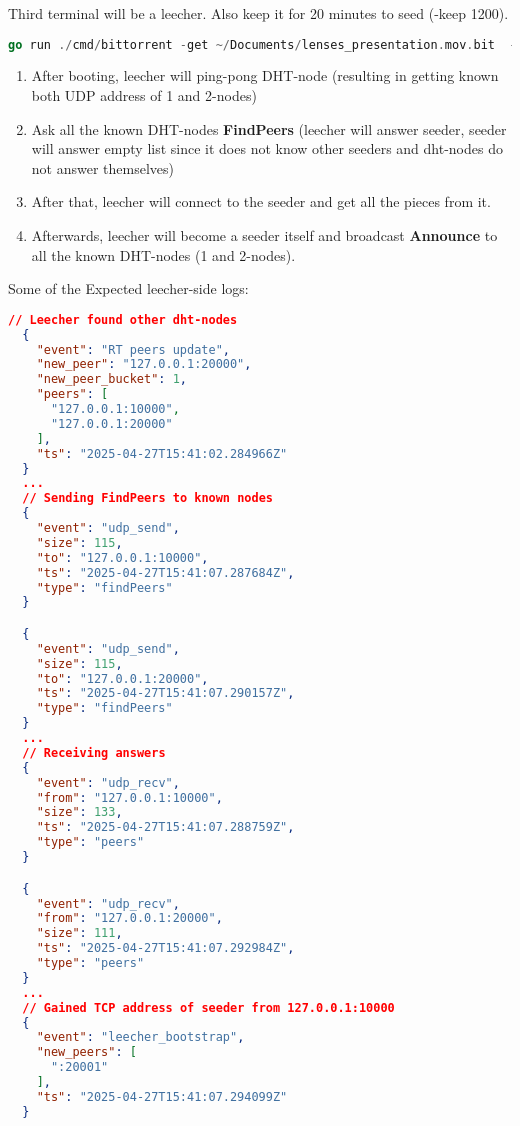 \documentclass[11pt,a4paper]{article}
\begin{document}
\vspace{8mm} Third terminal will be a leecher. Also keep it for 20 minutes to seed (-keep 1200).
\begin{lstlisting}[language=go]
  go run ./cmd/bittorrent -get ~/Documents/lenses_presentation.mov.bit  -bootstrap :10000 -dht-listen :30000  -tcp-listen :30001 -keep 1200 | jq .
\end{lstlisting}
\begin{enumerate}
  \item After booting, leecher will ping-pong DHT-node (resulting in getting known both UDP address of 1 and 2-nodes) 
  \item Ask all the known DHT-nodes \textbf{FindPeers} (leecher will answer seeder, seeder will answer empty list since it does not know other seeders and dht-nodes do not answer themselves)
  \item After that, leecher will connect to the seeder and get all the pieces from it.
  \item Afterwards, leecher will become a seeder itself and broadcast \textbf{Announce} to all the known DHT-nodes (1 and 2-nodes).
\end{enumerate}
Some of the Expected leecher-side logs:
\begin{lstlisting}[language=json]
  // Leecher found other dht-nodes
  {
    "event": "RT peers update",
    "new_peer": "127.0.0.1:20000",
    "new_peer_bucket": 1,
    "peers": [
      "127.0.0.1:10000",
      "127.0.0.1:20000"
    ],
    "ts": "2025-04-27T15:41:02.284966Z"
  }
  ...
  // Sending FindPeers to known nodes
  {
    "event": "udp_send",
    "size": 115,
    "to": "127.0.0.1:10000",
    "ts": "2025-04-27T15:41:07.287684Z",
    "type": "findPeers"
  }

  {
    "event": "udp_send",
    "size": 115,
    "to": "127.0.0.1:20000",
    "ts": "2025-04-27T15:41:07.290157Z",
    "type": "findPeers"
  }
  ...
  // Receiving answers
  {
    "event": "udp_recv",
    "from": "127.0.0.1:10000",
    "size": 133,
    "ts": "2025-04-27T15:41:07.288759Z",
    "type": "peers"
  }

  {
    "event": "udp_recv",
    "from": "127.0.0.1:20000",
    "size": 111,
    "ts": "2025-04-27T15:41:07.292984Z",
    "type": "peers"
  }
  ...
  // Gained TCP address of seeder from 127.0.0.1:10000
  {
    "event": "leecher_bootstrap",
    "new_peers": [
      ":20001"
    ],
    "ts": "2025-04-27T15:41:07.294099Z"
  }
\end{lstlisting}
\end{document}
